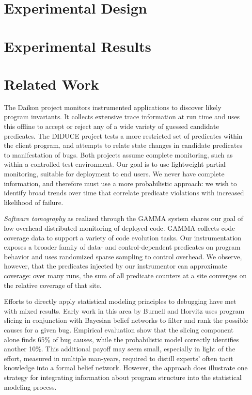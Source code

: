 \documentclass{sig-alternate}
\newcommand{\termdef}[1]{\textit{#1}}
\begin{document}
\section{Experimental Design}
\label{sec:experiments:setup}


\section{Experimental Results}
\label{sec:experiments:results}



\section{Related Work}
\label{sec:related-work}

The Daikon project \cite{ernst2001} monitors instrumented applications
to discover likely program invariants.  It collects extensive trace
information at run time and uses this offline to accept or reject any
of a wide variety of guessed candidate predicates.  The DIDUCE project
\cite{ICSE02*291} tests a more restricted set of predicates within the
client program, and attempts to relate state changes in candidate
predicates to manifestation of bugs.  Both projects assume complete
monitoring, such as within a controlled test environment.  Our goal is
to use lightweight partial monitoring, suitable for deployment to end
users.  We never have complete information, and therefore must use a
more probabilistic approach: we wish to identify broad trends over
time that correlate predicate violations with increased likelihood of
failure.

\termdef{Software tomography} as realized through the GAMMA system
\cite{PASTE'02*2,Orso:2003:LFDIART} shares our goal of low-overhead
distributed monitoring of deployed code.  GAMMA collects code coverage
data to support a variety of code evolution tasks.  Our
instrumentation exposes a broader family of data- and
control-dependent predicates on program behavior and uses randomized
sparse sampling to control overhead.  We observe, however, that the
predicates injected by our instrumentor can approximate coverage: over
many runs, the sum of all predicate counters at a site converges on
the relative coverage of that site.

Efforts to directly apply statistical modeling principles to debugging
have met with mixed results.  Early work in this area by Burnell and
Horvitz \cite{Burnell:1995:SCM} uses program slicing in conjunction
with Bayesian belief networks to filter and rank the possible causes
for a given bug.  Empirical evaluation show that the slicing component
alone finds 65\% of bug causes, while the probabilistic model
correctly identifies another 10\%.  This additional payoff may seem
small, especially in light of the effort, measured in multiple
man-years, required to distill experts' often tacit knowledge into a
formal belief network.  However, the approach does illustrate one
strategy for integrating information about program structure into the
statistical modeling process.
\end{document}
